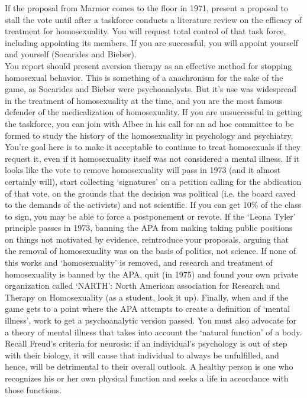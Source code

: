 If the proposal from Marmor comes to the floor in 1971, present a proposal to stall the vote until after a taskforce conducts a literature review on the efficacy of treatment for homosexuality. You will request total control of that task force, including appointing its members. If you are successful, you will appoint yourself and yourself (Socarides and Bieber).\\
You report should present aversion therapy as an effective method for stopping homosexual behavior. This is something of a anachronism for the sake of the game, as Socarides and Bieber were psychoanalysts. But it's use was widespread in the treatment of homosexuality at the time, and you are the most famous defender of the medicalization of homosexuality.
If you are unsuccessful in getting the taskforce, you can join with Albee in his call for an ad hoc committee to be formed to study the history of the homosexuality in psychology and psychiatry. You're goal here is to make it acceptable to continue to treat homosexuals if they request it, even if it homosexuality itself was not considered a mental illness.
If it looks like the vote to remove homosexuality will pass in 1973 (and it almost certainly will), start collecting `signatures' on a petition calling for the abdication of that vote, on the grounds that the decision was political (i.e. the board caved to the demands of the activists) and not scientific. If you can get 10\% of the class to sign, you may be able to force a postponement or revote.
If the `Leona Tyler' principle passes in 1973, banning the APA from making taking public positions on things not motivated by evidence, reintroduce your proposals, arguing that the removal of homosexuality was on the basis of politics, not science. If none of this works and `homosexuality' is removed, and research and treatment of homosexuality is banned by the APA, quit (in 1975) and found your own private organization called `NARTH': North American association for Research and Therapy on Homosexuality (as a student, look it up).
Finally, when and if the game gets to a point where the APA attempts to create a definition of ‘mental illness’, work to get a psychoanalytic version passed. You must also advocate for a theory of mental illness that takes into account the `natural function' of a body. Recall Freud's criteria for neurosis: if an individual's psychology is out of step with their biology, it will cause that individual to always be unfulfilled, and hence, will be detrimental to their overall outlook. A healthy person is one who recognizes his or her own physical function and seeks a life in accordance with those functions.

